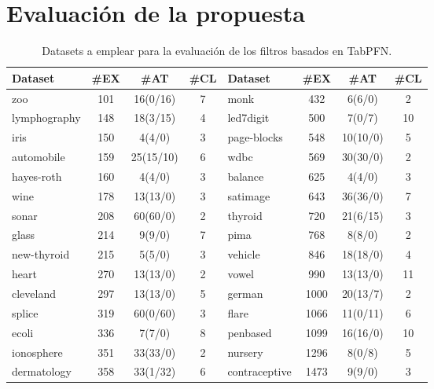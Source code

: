 \documentclass[print, color]{ugrTFG}
\begin{document}
 \section{Evaluación de la propuesta}
    \begin{table}[b!]
        \centering
        \footnotesize
        \caption{Datasets a emplear para la evaluación de los filtros basados en TabPFN.}
        \label{tab:datasets_ordenados}
        \begin{tabular}{lccc|lccc}
        \hline
        \textbf{Dataset} & \textbf{\#EX} & \textbf{\#AT} & \textbf{\#CL} &
        \textbf{Dataset} & \textbf{\#EX} & \textbf{\#AT} & \textbf{\#CL} \\
        \hline
        zoo           & 101 & 16(0/16)   & 7  & monk          & 432  & 6(6/0)     & 2  \\
        lymphography  & 148 & 18(3/15)   & 4  & led7digit     & 500  & 7(0/7)     & 10 \\
        iris          & 150 & 4(4/0)     & 3  & page-blocks   & 548  & 10(10/0)   & 5  \\
        automobile    & 159 & 25(15/10)  & 6  & wdbc          & 569  & 30(30/0)   & 2  \\
        hayes-roth    & 160 & 4(4/0)     & 3  & balance       & 625  & 4(4/0)     & 3  \\
        wine          & 178 & 13(13/0)   & 3  & satimage      & 643  & 36(36/0)   & 7  \\
        sonar         & 208 & 60(60/0)   & 2  & thyroid       & 720  & 21(6/15)   & 3  \\
        glass         & 214 & 9(9/0)     & 7  & pima          & 768  & 8(8/0)     & 2  \\
        new-thyroid   & 215 & 5(5/0)     & 3  & vehicle       & 846  & 18(18/0)   & 4  \\
        heart         & 270 & 13(13/0)   & 2  & vowel         & 990  & 13(13/0)   & 11 \\
        cleveland     & 297 & 13(13/0)   & 5  & german        & 1000 & 20(13/7)   & 2  \\
        splice        & 319 & 60(0/60)   & 3  & flare         & 1066 & 11(0/11)   & 6  \\
        ecoli         & 336 & 7(7/0)     & 8  & penbased      & 1099 & 16(16/0)   & 10 \\
        ionosphere    & 351 & 33(33/0)   & 2  & nursery       & 1296 & 8(0/8)     & 5  \\
        dermatology   & 358 & 33(1/32)   & 6  & contraceptive & 1473 & 9(9/0)     & 3  \\
        \hline
        \end{tabular}
    \end{table}
\end{document}
